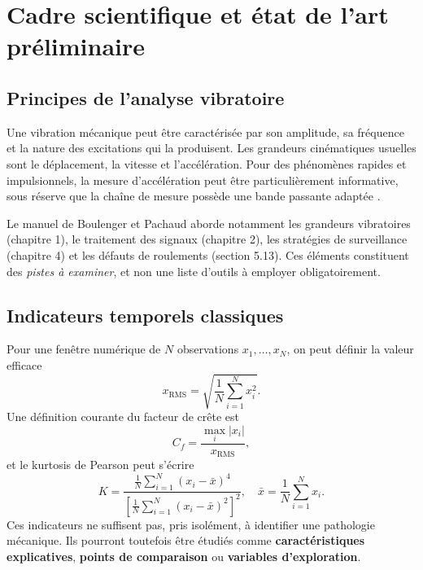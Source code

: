 \chapter{Cadre scientifique et état de l'art préliminaire}
\label{chap:cadre}

\section{Principes de l'analyse vibratoire}
Une vibration mécanique peut être caractérisée par son amplitude, sa fréquence et la nature des excitations qui la produisent. Les grandeurs cinématiques usuelles sont le déplacement, la vitesse et l'accélération. Pour des phénomènes rapides et impulsionnels, la mesure d'accélération peut être particulièrement informative, sous réserve que la chaîne de mesure possède une bande passante adaptée \cite{boulenger2009}.

Le manuel de Boulenger et Pachaud aborde notamment les grandeurs vibratoires (chapitre 1), le traitement des signaux (chapitre 2), les stratégies de surveillance (chapitre 4) et les défauts de roulements (section 5.13). Ces éléments constituent des \emph{pistes à examiner}, et non une liste d'outils à employer obligatoirement.

\section{Indicateurs temporels classiques}
Pour une fenêtre numérique de $N$ observations $x_1,\ldots,x_N$, on peut définir la valeur efficace
\begin{equation}
  x_{\mathrm{RMS}}=\sqrt{\frac{1}{N}\sum_{i=1}^{N}x_i^2}.
  \label{eq:rms}
\end{equation}
Une définition courante du facteur de crête est
\begin{equation}
  C_f=\frac{\max_i |x_i|}{x_{\mathrm{RMS}}},
  \label{eq:crest}
\end{equation}
et le kurtosis de Pearson peut s'écrire
\begin{equation}
  K=\frac{\frac{1}{N}\sum_{i=1}^{N}(x_i-\bar{x})^4}
          {\left[\frac{1}{N}\sum_{i=1}^{N}(x_i-\bar{x})^2\right]^2},
  \quad \bar{x}=\frac{1}{N}\sum_{i=1}^{N}x_i.
  \label{eq:kurtosis}
\end{equation}
Ces indicateurs ne suffisent pas, pris isolément, à identifier une pathologie mécanique. Ils pourront toutefois être étudiés comme \textbf{caractéristiques explicatives}, \textbf{points de comparaison} ou \textbf{variables d'exploration}.

